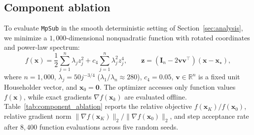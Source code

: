 \documentclass[smallextended]{svjour3}
\newcommand{\bx}{\bm{x}}
\newcommand{\bz}{\bm{z}}
\begin{document}
\subsection{Component ablation}
\label{subsec:component_ablation}

To evaluate \texttt{MpSub} in the smooth deterministic setting of Section~\ref{sec:analysis}, we minimize a $1{,}000$-dimensional nonquadratic function with rotated coordinates and power-law spectrum:
\begin{equation}
\label{eq:quartic_benchmark}
f(\bx) = \frac{1}{2}\sum_{j=1}^{n} \lambda_j z_j^2 + c_4 \sum_{j=1}^{n} \lambda_j^2 z_j^4,
\qquad \bz = (\bm I_n - 2\bm v\bm v^\top)(\bx - \bx_\star),
\end{equation}
where $n = 1{,}000$, $\lambda_j = 50 j^{-3/4}$ ($\lambda_1/\lambda_n \approx 280$), $c_4 = 0.05$, $\bm v \in \mathbb{R}^n$ is a fixed unit Householder vector, and $\bx_0 = \bm 0$. The optimizer accesses only function values $f(\bx)$, while exact gradients $\nabla f(\bx_k)$ are evaluated offline. Table~\ref{tab:component_ablation} reports the relative objective $f(\bx_K)/f(\bx_0)$, relative gradient norm $\|\nabla f(\bx_K)\|_2/\allowbreak\|\nabla f(\bx_0)\|_2$, and step acceptance rate after $8{,}400$ function evaluations across five random seeds.
\end{document}

